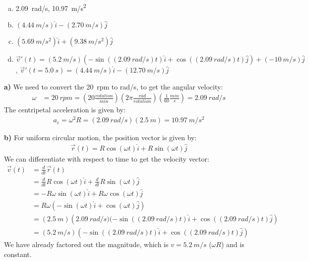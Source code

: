 \begin{finalanswer}
\begin{enumerate}[(a)]
\item \SI{2.09}{rad/s}, \SI{10.97}{m/s^2}
\item $(\SI{4.44}{m/s})\hat i - (\SI{2.70}{m/s})\hat j$
\item $(\SI{5.69}{m/s^2})\hat i + (\SI{9.38}{m/s^2})\hat j$
\item $\vec v'(t) = (\SI{5.2}{m/s})\left(-\sin((\SI{2.09}{rad/s})t) \hat i + \cos( (\SI{2.09}{rad/s}) t) \hat j\right)+(\SI{-10}{m/s})\hat j$, $\vec v'(t=\SI{5.0}{s})=(\SI{4.44}{m/s})\hat i - (\SI{12.70}{m/s})\hat j$
\end{enumerate}
\end{finalanswer}
\begin{solution}
\textbf{a)} We need to convert the \SI{20}{rpm} to \si{rad/s}, to get the angular velocity:
\begin{align*}
\omega &=\SI{20}{rpm}=(20\frac{\si{rotation}}{\si{min}})(2\pi\frac{\si{rad}}{\si{rotation}})(\frac{1}{60}\frac{\si{min}}{\si{s}})=\SI{2.09}{rad/s}
\end{align*}
The centripetal acceleration is given by:
\begin{align*}
a_c=\omega^2 R=(\SI{2.09}{rad/s})(\SI{2.5}{m})=\SI{10.97}{m/s^2}
\end{align*}

\textbf{b)} For uniform circular motion, the position vector is given by:
\begin{align*}
\vec r(t) = R\cos(\omega t)\hat i+R\sin(\omega t)\hat j
\end{align*}
We can differentiate with respect to time to get the velocity vector:
\begin{align*}
\vec v(t) &=\frac{d}{dt}\vec r(t)\\
&=\frac{d}{dt}R\cos(\omega t)\hat i+\frac{d}{dt}R\sin(\omega t)\hat j\\
&=-R\omega\sin(\omega t)\hat i + R\omega \cos(\omega t) \hat j\\
&=R\omega\left(-\sin(\omega t)\hat i + \cos(\omega t) \hat j\right) \\
&=(\SI{2.5}{m})\left(\SI{2.09}{rad/s})(-\sin((\SI{2.09}{rad/s})t) \hat i + \cos( (\SI{2.09}{rad/s}) t)\hat j\right)\\
&=(\SI{5.2}{m/s})\left(-\sin((\SI{2.09}{rad/s})t) \hat i + \cos( (\SI{2.09}{rad/s}) t) \hat j\right)
\end{align*}
We have already factored out the magnitude, which is $v=\SI{5.2}{m/s}$ ($\omega R$) and is constant.


\end{solution}
